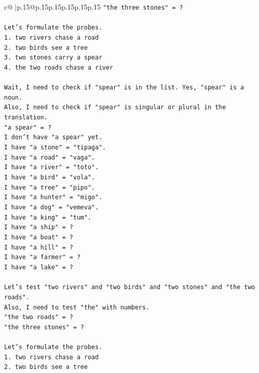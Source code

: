 \documentclass{article}
\begin{document}
{\begin{supertabular}{c@{$\;$}|p{.15\linewidth}@{}p{.15\linewidth}p{.15\linewidth}p{.15\linewidth}p{.15\linewidth}p{.15\linewidth}}
{{{\texttt{"the three stones" = ?} \\
\\ 
\texttt{Let's formulate the probes.} \\
\texttt{1. two rivers chase a road} \\
\texttt{2. two birds see a tree} \\
\texttt{3. two stones carry a spear} \\
\texttt{4. the two roads chase a river} \\
\\ 
\texttt{Wait, I need to check if "spear" is in the list. Yes, "spear" is a noun.} \\
\texttt{Also, I need to check if "spear" is singular or plural in the translation.} \\
\texttt{"a spear" = ?} \\
\texttt{I don't have "a spear" yet.} \\
\texttt{I have "a stone" = "tipaga".} \\
\texttt{I have "a road" = "vaga".} \\
\texttt{I have "a river" = "toto".} \\
\texttt{I have "a bird" = "vola".} \\
\texttt{I have "a tree" = "pipo".} \\
\texttt{I have "a hunter" = "migo".} \\
\texttt{I have "a dog" = "vemeva".} \\
\texttt{I have "a king" = "tum".} \\
\texttt{I have "a ship" = ?} \\
\texttt{I have "a boat" = ?} \\
\texttt{I have "a hill" = ?} \\
\texttt{I have "a farmer" = ?} \\
\texttt{I have "a lake" = ?} \\
\\ 
\texttt{Let's test "two rivers" and "two birds" and "two stones" and "the two roads".} \\
\texttt{Also, I need to test "the" with numbers.} \\
\texttt{"the two roads" = ?} \\
\texttt{"the three stones" = ?} \\
\\ 
\texttt{Let's formulate the probes.} \\
\texttt{1. two rivers chase a road} \\
\texttt{2. two birds see a tree} \\
}}}
\end{supertabular}}
\end{document}
